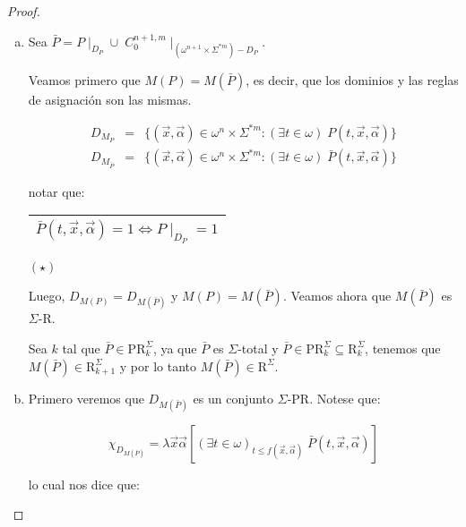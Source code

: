   \begin{proof}
    \begin{enumerate}[a)]
      \item Sea $\bar{P} = P \mid_{D_{P}} \cup \; C_{0}^{n+1,m} \mid_{(\omega^{n+1} \times \Sigma^{\ast m})-D_{P}}$.

        \par Veamos primero que $M(P) = M(\bar{P})$, es decir, que los dominios y las reglas de asignación son las
        mismas.

        \begin{eqnarray}
          \nonumber D_{M_{P}} &=& \{(\vec{x},\vec{\alpha}) \in \omega^{n} \times \Sigma^{\ast m}: (\exists t \in \omega)
            \; P(t,\vec{x},\vec{\alpha})\} \\
          \nonumber D_{M_{\bar{P}}} &=& \{(\vec{x},\vec{\alpha}) \in \omega^{n} \times \Sigma^{\ast m}: (\exists t \in
            \omega) \; \bar{P}(t,\vec{x},\vec{\alpha})\}
        \end{eqnarray}

        \par notar que:

        \begin{center} \begin{tabular}{|c|} \hline $\bar{P}(t,\vec{x},\vec{\alpha}) = 1 \Leftrightarrow P \mid_{D_{P}} =
        1$ \\\hline \end{tabular} $(\star)$ \end{center}

        \par Luego, $D_{M(P)} = D_{M(\bar{P})}$ y $M(P) = M(\bar{P})$. Veamos ahora que $M(\bar{P})$ es $\Sigma$-R.

        \par Sea $k$ tal que $\bar{P} \in \mathrm{PR}_{k}^{\Sigma}$, ya que $\bar{P}$ es $\Sigma$-total y $\bar{P} \in
        \mathrm{PR}_{k}^{\Sigma} \subseteq \mathrm{R}_{k}^{\Sigma}$, tenemos que $M(\bar{P}) \in
        \mathrm{R}_{k+1}^{\Sigma}$ y por lo tanto $M(\bar{P}) \in \mathrm{R}^{\Sigma}$.

      \item Primero veremos que $D_{M(\bar{P})}$ es un conjunto $\Sigma$-PR. Notese que:

        \[
          \chi_{D_{M(\bar{P})}} = \lambda \vec{x}\vec{\alpha} \left[(\exists t \in \omega)_{t \leq
          f(\vec{x},\vec{\alpha})} \; \bar{P}(t,\vec{x},\vec{\alpha})\right]
        \]

        \par lo cual nos dice que:


\end{enumerate}
\end{proof}
